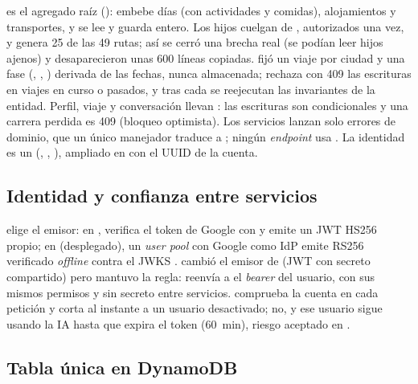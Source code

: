  es el agregado raíz (): embebe días (con actividades y comidas),
alojamientos y transportes, y se lee y guarda entero. Los hijos cuelgan de
, autorizados una vez, y  genera 25 de las
49 rutas; así se cerró una brecha real (se podían leer hijos ajenos) y
desaparecieron unas 600 líneas copiadas.  fijó un viaje por ciudad y una fase
(, , ) derivada de las fechas, nunca almacenada;
 rechaza con 409  las escrituras en viajes en curso o
pasados, y tras cada  se reejecutan las invariantes de la entidad. Perfil, viaje y conversación llevan : las escrituras son condicionales y
una carrera perdida es 409  (bloqueo optimista). Los servicios lanzan solo errores
de dominio, que un único manejador traduce a ; ningún
\emph{endpoint} usa . La
identidad es un  (, , ), ampliado en
 con el UUID de la cuenta.

\subsection{Identidad y confianza entre servicios}

 elige el emisor: en ,  verifica el token de Google
con  y emite un JWT HS256 \cite{sw:rfc7519} propio; en 
(desplegado), un \emph{user pool} con Google como IdP emite RS256 verificado \emph{offline} contra
el JWKS \cite{sw:rfc7517}.  cambió el emisor de  (JWT con secreto compartido)
pero mantuvo la regla:  reenvía a  el
\emph{bearer} del usuario, con sus mismos permisos y sin secreto entre servicios. 
comprueba la cuenta en cada petición y corta al instante a un usuario desactivado; 
no, y ese usuario sigue usando la IA hasta que expira el token (60~min), riesgo aceptado en
.

\subsection{Tabla única en DynamoDB}


